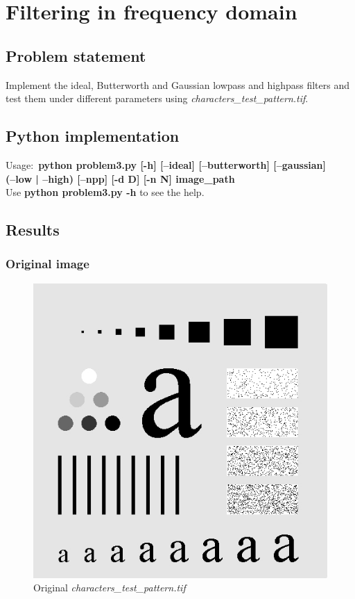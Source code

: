 \chapter{Filtering in frequency domain}

\section{Problem statement}

Implement the ideal, Butterworth and Gaussian lowpass and highpass filters
and test them under different parameters using \textit{characters\_test\_pattern.tif}.

\section{Python implementation}

Usage:~\textbf{python problem3.py [-h] [--ideal] [--butterworth] [--gaussian] \\
(--low | --high) [--npp] [-d D] [-n N] image\_path} \\

Use \textbf{python problem3.py -h} to see the help.

\section{Results}

    \subsection{Original image}

    \begin{figure}[!htb]\centering
        \includegraphics[width=0.5\linewidth]{./images/3/characters.jpg}
        \caption{Original \textit{characters\_test\_pattern.tif}}
        \label{diagram:characters}
    \end{figure}


